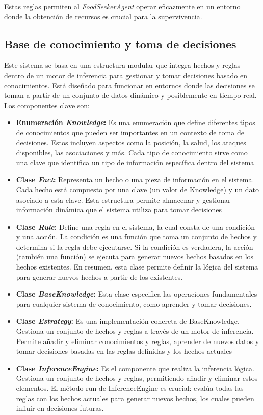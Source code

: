 \documentclass[11pt]{article}
\begin{document}
Estas reglas permiten al \textit{FoodSeekerAgent} operar eficazmente en un entorno donde la obtención de recursos es crucial para la supervivencia.

\subsection{Base de conocimiento y toma de decisiones}
Este sistema se basa en una estructura modular que integra hechos y reglas dentro de un motor de inferencia para gestionar y tomar decisiones basado en conocimientos. Está diseñado para funcionar en entornos donde las decisiones se toman a partir de un conjunto de datos dinámico y posiblemente en tiempo real. Los componentes clave son:

\begin{itemize}
    \item \textbf{Enumeración \textit{Knowledge}:} Es una enumeración que define diferentes tipos de conocimientos que pueden ser importantes en un contexto de toma de decisiones. Estos incluyen aspectos como la posición, la salud, los ataques disponibles, las asociaciones y más. Cada tipo de conocimiento sirve como una clave que identifica un tipo de información específica dentro del sistema
    \item \textbf{Clase \textit{Fact}:}  Representa un hecho o una pieza de información en el sistema. Cada hecho está compuesto por una clave (un valor de Knowledge) y un dato asociado a esta clave. Esta estructura permite almacenar y gestionar información dinámica que el sistema utiliza para tomar decisiones
    \item \textbf{Clase \textit{Rule}:}  Define una regla en el sistema, la cual consta de una condición y una acción. La condición es una función que toma un conjunto de hechos y determina si la regla debe ejecutarse. Si la condición es verdadera, la acción (también una función) se ejecuta para generar nuevos hechos basados en los hechos existentes. En resumen, esta clase permite definir la lógica del sistema para generar nuevos hechos a partir de los existentes.
    \item \textbf{Clase \textit{BaseKnowledge}:} Esta clase especifica las operaciones fundamentales para cualquier sistema de conocimiento, como aprender y tomar decisiones.
    \item \textbf{Clase \textit{Estrategy}:} Es una implementación concreta de BaseKnowledge. Gestiona un conjunto de hechos y reglas a través de un motor de inferencia. Permite añadir y eliminar conocimientos y reglas, aprender de nuevos datos y tomar decisiones basadas en las reglas definidas y los hechos actuales
    \item \textbf{Clase \textit{InferenceEngine}:} Es el componente que realiza la inferencia lógica. Gestiona un conjunto de hechos y reglas, permitiendo añadir y eliminar estos elementos. El método run de InferenceEngine es crucial: evalúa todas las reglas con los hechos actuales para generar nuevos hechos, los cuales pueden influir en decisiones futuras.
\end{itemize}
\end{document}
